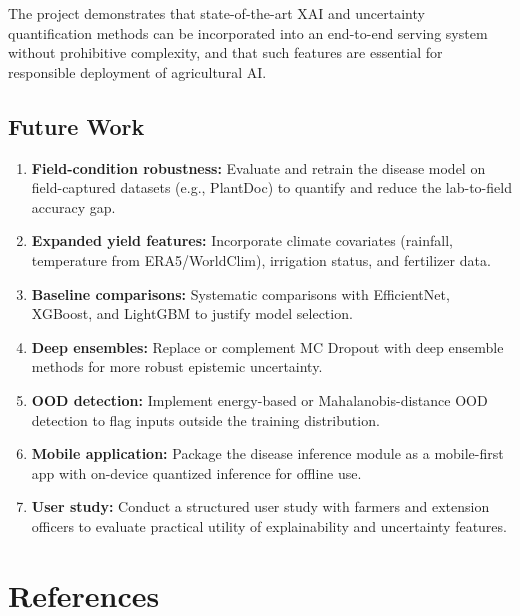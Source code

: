 \documentclass[12pt,a4paper]{report}
\begin{document}
The project demonstrates that state-of-the-art XAI and uncertainty quantification methods can be incorporated into an end-to-end serving system without prohibitive complexity, and that such features are essential for responsible deployment of agricultural AI.

\section{Future Work}
\begin{enumerate}[leftmargin=*]
  \item \textbf{Field-condition robustness:} Evaluate and retrain the disease model on field-captured datasets (e.g., PlantDoc) to quantify and reduce the lab-to-field accuracy gap.
  \item \textbf{Expanded yield features:} Incorporate climate covariates (rainfall, temperature from ERA5/WorldClim), irrigation status, and fertilizer data.
  \item \textbf{Baseline comparisons:} Systematic comparisons with EfficientNet, XGBoost, and LightGBM to justify model selection.
  \item \textbf{Deep ensembles:} Replace or complement MC Dropout with deep ensemble methods for more robust epistemic uncertainty.
  \item \textbf{OOD detection:} Implement energy-based or Mahalanobis-distance OOD detection to flag inputs outside the training distribution.
  \item \textbf{Mobile application:} Package the disease inference module as a mobile-first app with on-device quantized inference for offline use.
  \item \textbf{User study:} Conduct a structured user study with farmers and extension officers to evaluate practical utility of explainability and uncertainty features.
\end{enumerate}

\clearpage
\chapter*{References}




\clearpage
\appendix
\renewcommand{\thechapter}{\Alph{chapter}}
\renewcommand{\thesection}{\Roman{section}}
\end{document}
